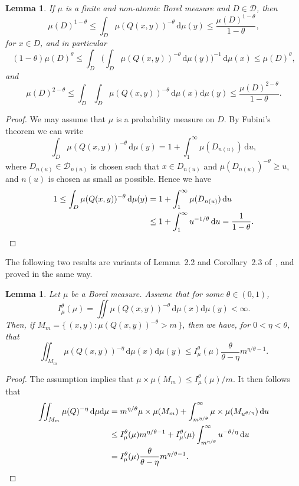 \documentclass[11pt]{article}
\newtheorem{lemm}[theo]{Lemma}
\theoremstyle{definition}
\numberwithin{equation}{section}
\numberwithin{figure}{section}
\numberwithin{table}{section}
\newcommand*{\dd}{\mathrm{d}}
\begin{document}
\begin{lemm}\label{lem:energyestimate}
If $\mu$ is a finite and non-atomic Borel measure and $D\in
\mathscr{D}$, then
\[
\mu(D)^{1-\theta} \leq \int_D \mu (Q(x,y))^{-\theta} \, \dd
\mu (y) \leq \frac{\mu(D)^{1 - \theta}}{1 - \theta},
\]
for $x \in D$, and in particular
\[
(1 - \theta) \mu (D)^\theta \leq \int_D \biggl(\int_D \mu (Q(x,y))^{-\theta} \, \dd \mu (y) \biggr)^{-1} \, \dd
\mu (x) \leq \mu (D)^\theta,
\]
and
\[
\mu(D)^{2-\theta} \leq \int_D \int_D \mu(Q(x,y))^{-\theta} \,
\dd \mu(x) \dd \mu (y) \leq \frac{\mu(D)^{2-\theta}}{1 - \theta}.
\]
\end{lemm}

\begin{proof}
We may assume that $\mu$ is a probability measure on $D$. By Fubini's theorem we can write
\[
\int_D \mu (Q(x,y))^{-\theta} \, \dd \mu (y) = 1 +
\int_1^\infty \mu (D_{n(u)}) \, \dd u,
\]
where $D_{n(u)} \in \mathscr{D}_{n(u)}$ is chosen such that $x \in D_{n(u)}$ and $\mu (D_{n(u)})^{-\theta} \geq u$, and $n (u)$ is chosen as small as possible. Hence we have
\begin{align*}
1 \leq \int_D \mu (Q(x,y))^{-\theta} \, \dd \mu (y) &= 1 +
\int_1^\infty \mu (D_{n(u)}) \, \dd u \\ &\leq 1 +
\int_1^\infty u^{-1/\theta} \, \dd u = \frac{1}{1 -
\theta}. \qedhere
\end{align*}
\end{proof}

The following two results are variants of Lemma~2.2 and Corollary~2.3 of~\cite{perssonreeve}, and proved in the same way.

\begin{lemm}\label{lem:Mm}
Let $\mu$ be a Borel measure. Assume that for some $\theta \in (0,1)$,
\[
I_\mu^\theta (\mu) = \iint \mu (Q(x,y))^{-\theta} \,
\dd\mu (x) \dd \mu (y) < \infty.
\]
Then, if $M_m = \{\, (x,y) : \mu (Q(x,y))^{-\theta} > m \,\}$, then we have, for $0 < \eta < \theta$, that
\[
\iint_{M_m} \mu (Q(x,y))^{-\eta} \, \dd \mu (x) \dd
\mu (y) \leq I_\mu^\theta (\mu) \frac{\theta}{\theta - \eta} m^{\eta/\theta - 1}.
\]
\end{lemm}

\begin{proof}
The assumption implies that $\mu \times \mu (M_m) \leq I_\mu^\theta (\mu) /m$. It then follows that
\begin{align*}
\iint_{M_m} \mu (Q)^{-\eta} \, \dd\mu \dd \mu & = m^{\eta/\theta} \mu \times \mu (M_m) +
\int_{m^{\eta/\theta}}^\infty \mu \times \mu (M_{u^{\theta/\eta}})
\, \dd u \\ &\leq I_\mu^\theta (\mu) m^{\eta/\theta - 1} + I_\mu^\theta (\mu) \int_{m^{\eta/\theta}}^\infty u^{-\theta/\eta}
\, \dd u \\ &= I_\mu^\theta (\mu) \frac{\theta}{\theta -
\eta} m^{\eta/\theta - 1}. \qedhere
\end{align*}
\end{proof}
\end{document}
